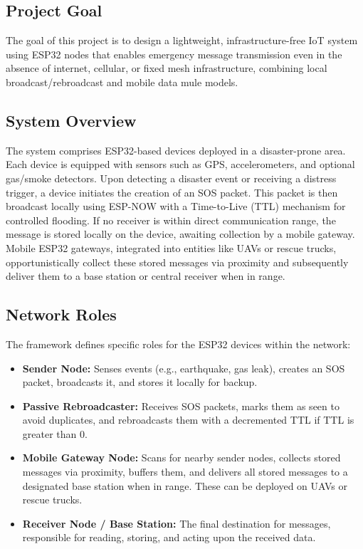 \documentclass[12pt, a4paper]{article}
\begin{document}
\subsection{Project Goal}
The goal of this project is to design a lightweight, infrastructure-free IoT system using ESP32 nodes that enables emergency message transmission even in the absence of internet, cellular, or fixed mesh infrastructure, combining local broadcast/rebroadcast and mobile data mule models.

\subsection{System Overview}
The system comprises ESP32-based devices deployed in a disaster-prone area. Each device is equipped with sensors such as GPS, accelerometers, and optional gas/smoke detectors. Upon detecting a disaster event or receiving a distress trigger, a device initiates the creation of an SOS packet. This packet is then broadcast locally using ESP-NOW with a Time-to-Live (TTL) mechanism for controlled flooding. If no receiver is within direct communication range, the message is stored locally on the device, awaiting collection by a mobile gateway. Mobile ESP32 gateways, integrated into entities like UAVs or rescue trucks, opportunistically collect these stored messages via proximity and subsequently deliver them to a base station or central receiver when in range.

\subsection{Network Roles}
The framework defines specific roles for the ESP32 devices within the network:
\begin{itemize}
    \item \textbf{Sender Node:} Senses events (e.g., earthquake, gas leak), creates an SOS packet, broadcasts it, and stores it locally for backup.
    \item \textbf{Passive Rebroadcaster:} Receives SOS packets, marks them as seen to avoid duplicates, and rebroadcasts them with a decremented TTL if TTL is greater than 0.
    \item \textbf{Mobile Gateway Node:} Scans for nearby sender nodes, collects stored messages via proximity, buffers them, and delivers all stored messages to a designated base station when in range. These can be deployed on UAVs or rescue trucks.
    \item \textbf{Receiver Node / Base Station:} The final destination for messages, responsible for reading, storing, and acting upon the received data.
\end{itemize}
\end{document}
